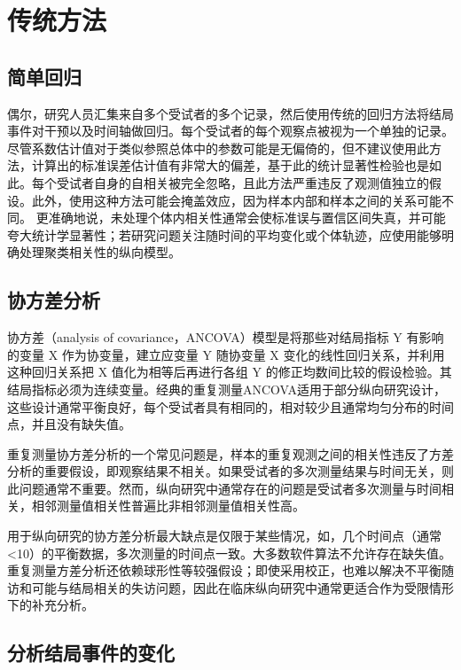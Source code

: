 \documentclass[
  chinese-hans,
  letterpaper,
  DIV=11,
  numbers=noendperiod]{scrreprt}
\begin{document}
\section{传统方法}\label{ux4f20ux7edfux65b9ux6cd5}

\subsection{简单回归}\label{ux7b80ux5355ux56deux5f52}

偶尔，研究人员汇集来自多个受试者的多个记录，然后使用传统的回归方法将结局事件对干预以及时间轴做回归。每个受试者的每个观察点被视为一个单独的记录。尽管系数估计值对于类似参照总体中的参数可能是无偏倚的，但不建议使用此方法，计算出的标准误差估计值有非常大的偏差，基于此的统计显著性检验也是如此。每个受试者自身的自相关被完全忽略，且此方法严重违反了观测值独立的假设。此外，使用这种方法可能会掩盖效应，因为样本内部和样本之间的关系可能不同。
更准确地说，未处理个体内相关性通常会使标准误与置信区间失真，并可能夸大统计学显著性；若研究问题关注随时间的平均变化或个体轨迹，应使用能够明确处理聚类相关性的纵向模型。

\subsection{协方差分析}\label{ux534fux65b9ux5deeux5206ux6790}

协方差（analysis of covariance，ANCOVA）模型是将那些对结局指标 Y
有影响的变量 X 作为协变量，建立应变量 Y 随协变量 X
变化的线性回归关系，并利用这种回归关系把 X 值化为相等后再进行各组 Y
的修正均数间比较的假设检验。其结局指标必须为连续变量。经典的重复测量ANCOVA适用于部分纵向研究设计，这些设计通常平衡良好，每个受试者具有相同的，相对较少且通常均匀分布的时间点，并且没有缺失值。

重复测量协方差分析的一个常见问题是，样本的重复观测之间的相关性违反了方差分析的重要假设，即观察结果不相关。如果受试者的多次测量结果与时间无关，则此问题通常不重要。然而，纵向研究中通常存在的问题是受试者多次测量与时间相关，相邻测量值相关性普遍比非相邻测量值相关性高。

用于纵向研究的协方差分析最大缺点是仅限于某些情况，如，几个时间点（通常\textless10）的平衡数据，多次测量的时间点一致。大多数软件算法不允许存在缺失值。
重复测量方差分析还依赖球形性等较强假设；即使采用校正，也难以解决不平衡随访和可能与结局相关的失访问题，因此在临床纵向研究中通常更适合作为受限情形下的补充分析。

\subsection{分析结局事件的变化}\label{ux5206ux6790ux7ed3ux5c40ux4e8bux4ef6ux7684ux53d8ux5316}
\end{document}
